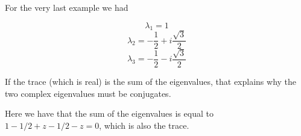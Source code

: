 \documentclass[11pt, oneside]{article}
\begin{document}
For the very last example we had

\[ \lambda_1 = 1 \]
\[ \lambda_2 = -\frac{1}{2} + i\frac{\sqrt{3}}{2} \]
\[ \lambda_3 = -\frac{1}{2} - i\frac{\sqrt{3}}{2} \]

If the trace (which is real) is the sum of the eigenvalues, that explains why the two complex eigenvalues must be conjugates.

Here we have that the sum of the eigenvalues is equal to $1 - 1/2 + z - 1/2 - z = 0$, which is also the trace.
\end{document}
